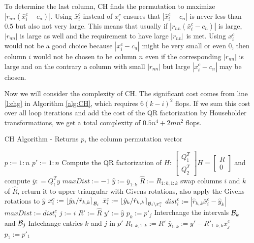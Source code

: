 \documentclass[12pt,Bold,letterpaper]{mcgilletdclass}
\newcommand{\bsmx}{\left[\begin{smallmatrix}}
\newcommand{\esmx}{\end{smallmatrix}\right]}
\begin{document}
To determine the last column, CH finds the permutation to 
maximize $\left |r_{nn}(\bar{x}_i^c-c_n) \right |$. Using $\bar{x}_i^c$ instead of $x_i^c$
ensures that $\left | \bar{x}_i^c-c_n \right |$ is never less than $0.5$ but
also not very large. This means that usually if $\left | r_{nn}(\bar{x}_i^c-c_n)
\right |$ is large, $\left | r_{nn} \right |$ is large as well and the
requirement to have large $|r_{nn}|$ %
is met.
Using $x_i^c$ would not be a good choice because $\left | x_i^c - c_n \right |$ might be 
very small or even $0$, then column $i$ would not be chosen to be column $n$
even if the corresponding $|r_{nn}|$ is large and on the contrary a column with small $|r_{nn}|$
but large $|x_i^c-c_n|$ may be chosen.

Now we will consider the complexity of CH. The 
significant cost comes from line \ref{l:chg} in Algorithm \ref{alg:CH},
which requires $6(k-i)^2$ flops.
If we sum this cost over all loop iterations and add the cost of the QR factorization by Householder transformations, 
we  get a total complexity of $0.5n^4+2mn^2$ flops.

\begin{algorithm}
\caption{CH Algorithm - Returns $p$, the column permutation vector}
\label{alg:CH}
\begin{algorithmic}[1]
\STATE $p := 1:n$
\STATE $p' := 1:n$
\STATE Compute the QR factorization of $H$: $\bsmx Q_1^T \\ Q_2^T \esmx H= \bsmx R\\ 0 \esmx$
             and compute  $\bar{y} : = Q_1^Ty$
  	\STATE $maxDist := -1$
    	\STATE $\hat{y} := \bar{y}_{1:k}$
    	\STATE $\hat{R} := R_{1:k,1:k}$
        \STATE  \label{l:chg} swap columns $i$ and $k$ of $\hat{R}$, return it  to upper
triangular with Givens rotations, also apply the Givens rotations to $\hat{y}$ %
        \STATE $x_i^c := \left \lfloor\hat{y}_k/\hat{r}_{k,k}\right
\rceil_{{\cal B}_i}$
        \STATE $\bar{x}_i^c := \left \lfloor\hat{y}_k/\hat{r}_{k,k}\right
\rceil_{{\cal B}_i\backslash x_i^c}$
        \STATE $dist_i^c := \left | \hat{r}_{k,k}\bar{x}_i^c - \hat{y}_k
\right | $
        	\STATE $maxDist := dist_i^c$
        	\STATE $j := i$
        	\STATE $R' := \hat{R}$
        	\STATE $y' := \hat{y}$
        \ENDIF
    \ENDFOR
    \STATE $p_k := p'_j$
    \STATE Interchange the intervals ${{\cal B}_k}$ and ${{\cal B}_{j}}$
    \STATE Intechange entries $k$ and $j$ in $p'$
    \STATE $R_{1:k,1:k} := R'$
    \STATE $\bar{y}_{1:k} := y' - R'_{1:k,k}x_j^c$
  \ENDFOR
  \STATE $p_1 := p'_1$
\end{algorithmic}
\end{algorithm}
\end{document}
